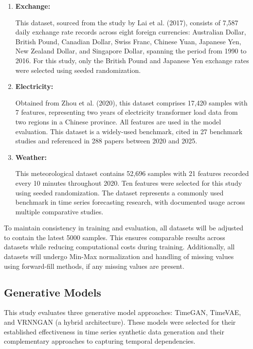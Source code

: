 \documentclass[11pt]{article}
\begin{document}
\begin{enumerate}
    \item \textbf{Exchange:} 
    
    This dataset, sourced from the study by Lai et al. (2017), consists of 7,587 daily exchange rate records across eight foreign currencies: Australian Dollar, British Pound, Canadian Dollar, Swiss Franc, Chinese Yuan, Japanese Yen, New Zealand Dollar, and Singapore Dollar, spanning the period from 1990 to 2016. For this study, only the British Pound and Japanese Yen exchange rates were selected using seeded randomization.

    \item \textbf{Electricity:} 
    
    Obtained from Zhou et al. (2020), this dataset comprises 17,420 samples with 7 features, representing two years of electricity transformer load data from two regions in a Chinese province. All features are used in the model evaluation. This dataset is a widely-used benchmark, cited in 27 benchmark studies and referenced in 288 papers between 2020 and 2025.

    \item \textbf{Weather:} 

    This meteorological dataset contains 52,696 samples with 21 features recorded every 10 minutes throughout 2020. Ten features were selected for this study using seeded randomization. The dataset represents a commonly used benchmark in time series forecasting research, with documented usage across multiple comparative studies.

\end{enumerate}

To maintain consistency in training and evaluation, all datasets will be adjusted to contain the latest 5000 samples. This ensures comparable results across datasets while reducing computational costs during training. Additionally, all datasets will undergo Min-Max normalization and handling of missing values using forward-fill methods, if any missing values are present.

\subsection{Generative Models}
This study evaluates three generative model approaches: TimeGAN, TimeVAE, and VRNNGAN (a hybrid architecture). These models were selected for their established effectiveness in time series synthetic data generation and their complementary approaches to capturing temporal dependencies.
\end{document}
